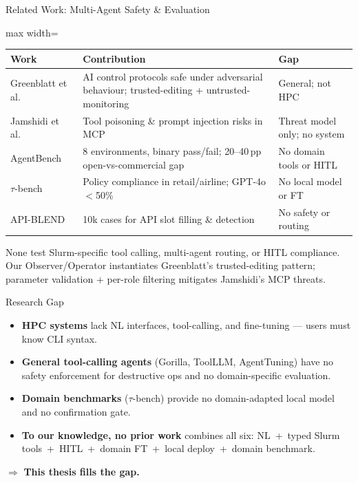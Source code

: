 \begin{frame}{Related Work: Multi-Agent Safety \& Evaluation}
  \small
  \renewcommand{\arraystretch}{1.15}
  \begin{adjustbox}{max width=\textwidth}
  \begin{tabular}{lp{6.5cm}l}
    \toprule
    \textbf{Work} & \textbf{Contribution} & \textbf{Gap} \\
    \midrule
    Greenblatt et al.~\cite{greenblatt2024aicontrol}
      & AI control protocols safe under adversarial behaviour; trusted-editing + untrusted-monitoring
      & General; not HPC \\[0.3em]
    Jamshidi et al.~\cite{jamshidi2025mcpsecurity}
      & Tool poisoning \& prompt injection risks in MCP
      & Threat model only; no system \\[0.3em]
    AgentBench~\cite{liu2023agentbench}
      & 8 environments, binary pass/fail; 20--40\,pp open-vs-commercial gap
      & No domain tools or HITL \\[0.3em]
    $\tau$-bench~\cite{yao2024taubench}
      & Policy compliance in retail/airline; GPT-4o $<$50\%
      & No local model or FT \\[0.3em]
    API-BLEND~\cite{basu2024apiblend}
      & 10k cases for API slot filling \& detection
      & No safety or routing \\
    \bottomrule
  \end{tabular}
  \end{adjustbox}

  \vspace{0.5em}
  \footnotesize
  None test Slurm-specific tool calling, multi-agent routing, or HITL compliance.\\
  Our Observer/Operator instantiates Greenblatt's trusted-editing pattern; parameter validation + per-role filtering mitigates Jamshidi's MCP threats.
\end{frame}

\begin{frame}{Research Gap}
  \begin{itemize}\setlength{\itemsep}{8pt}
    \item \textbf{HPC systems} lack NL interfaces, tool-calling, and fine-tuning --- users must know CLI syntax.
    \item \textbf{General tool-calling agents} (Gorilla, ToolLLM, AgentTuning) have no safety enforcement for destructive ops and no domain-specific evaluation.
    \item \textbf{Domain benchmarks} ($\tau$-bench) provide no domain-adapted local model and no confirmation gate.
    \item \textbf{To our knowledge, no prior work} combines all six: NL~+~typed Slurm tools~+~HITL~+~domain FT~+~local deploy~+~domain benchmark.
  \end{itemize}
  \vspace{0.5em}
  \centering
  $\Rightarrow$ \textbf{This thesis fills the gap.}
\end{frame}
